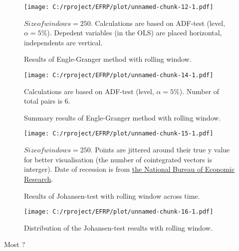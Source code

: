 \documentclass[12pt, a4paper, twoside, titlepage]{article}
\begin{document}
\begin{figure}[ht]
  \centering
  \texttt{[image: C:/rproject/EFRP/plot/unnamed-chunk-12-1.pdf]}
  \label{fig5}
  \caption{Results of Engle-Granger method with rolling window.}
  $Size of windows = 250$. Calculations are based on ADF-test (level, $\alpha = 5\%$). Depedent variables (in the OLS) are placed horizontal, independents are vertical.
\end{figure}

\begin{figure}[ht]
  \centering
  \texttt{[image: C:/rproject/EFRP/plot/unnamed-chunk-14-1.pdf]}
  \label{fig6}
  \caption{Summary results of Engle-Granger method with rolling window.}
  Calculations are based on ADF-test (level, $\alpha = 5\%$). Number of total pairs is 6.
\end{figure}

\begin{figure}[ht]
  \centering
  \texttt{[image: C:/rproject/EFRP/plot/unnamed-chunk-15-1.pdf]}
  \label{fig7}
  \caption{Results of Johansen-test with rolling window across time.}
  $Size of windows = 250$. Points are jittered around their true y value for better visualisation (the number of cointegrated vectors is interger). Date of recession is from \href{https://www.nber.org/cycles.html}{the National Bureau of Economic Research}.
\end{figure}

\begin{figure}[ht]
  \centering
  \texttt{[image: C:/rproject/EFRP/plot/unnamed-chunk-16-1.pdf]}
  \label{fig8}
  \caption{Distribution of the Johansen-test results with rolling window.}
\end{figure}

Most %
?

\begin{appendix}
  \listoffigures
  \listoftables
\end{appendix}



\end{document}
